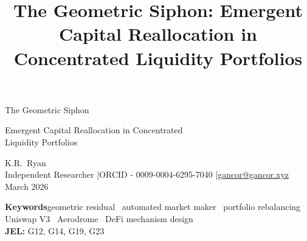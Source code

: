 \documentclass[11pt,a4paper]{article}
\title{The Geometric Siphon: Emergent Capital Reallocation in Concentrated Liquidity Portfolios}
\begin{document}
\sloppy
\thispagestyle{plain}

\noindent\parbox[t][8.05cm][t]{\linewidth}{%
\begin{center}
{\fontsize{25pt}{29pt}\selectfont The Geometric Siphon}\\[16pt]
{\fontsize{17pt}{18pt}\selectfont Emergent Capital Reallocation in Concentrated\\[10pt] 
Liquidity Portfolios\strut}

\vspace{24pt}
{\large K.R.\ Ryan}\\[4pt]
{\fontsize{9pt}{11pt}\selectfont Independent Researcher \quad|\quad ORCID - 0009-0004-6295-7040 \quad|\quad \href{mailto:gancor@gancor.xyz}{gancor@gancor.xyz}}\\[4pt]
{\fontsize{9pt}{11pt}\selectfont March 2026}

\vspace{8pt}
{\fontsize{9pt}{11pt}\selectfont
\textbf{Keywords}\hspace{0.6em}geometric residual \textperiodcentered\ automated market maker \textperiodcentered\ portfolio rebalancing \\
Uniswap V3 \textperiodcentered\ Aerodrome \textperiodcentered\ DeFi mechanism design\\[4pt]
\textbf{JEL:} G12, G14, G19, G23}
\end{center}}

\vspace{-1pt}
\centerline{\scalebox{1.5}{$\therefore$}}
\vspace{14pt}
\end{document}
